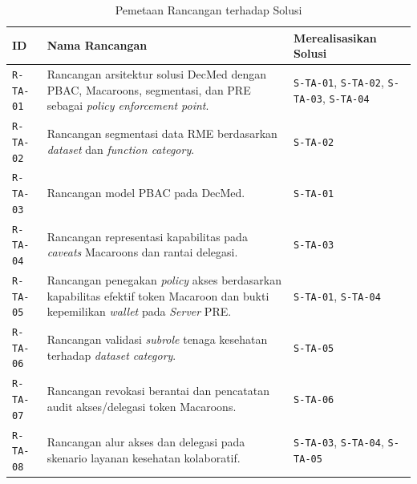 \documentclass[bahasa, 12pt, a4paper, onecolumn, oneside, final]{report}
\begin{document}
\begin{table}[!ht]
	\centering
	\caption{Pemetaan Rancangan terhadap Solusi}
	\label{tab:daftar-rancangan-solusi}
	\small
	\begin{tabular}{|p{}|p{}|p{}|}
		\hline
		\textbf{ID}      & \textbf{Nama Rancangan}                                                                                                                                  & \textbf{Merealisasikan Solusi}                                         \\ \hline
		\texttt{R-TA-01} & Rancangan arsitektur solusi DecMed dengan PBAC, Macaroons, segmentasi, dan PRE sebagai \textit{policy enforcement point}.                                & \texttt{S-TA-01}, \texttt{S-TA-02}, \texttt{S-TA-03}, \texttt{S-TA-04} \\ \hline
		\texttt{R-TA-02} & Rancangan segmentasi data RME berdasarkan \textit{dataset} dan \textit{function category}.                                                               & \texttt{S-TA-02}                                                       \\ \hline
		\texttt{R-TA-03} & Rancangan model PBAC pada DecMed.                                                                                                                        & \texttt{S-TA-01}                                                       \\ \hline
		\texttt{R-TA-04} & Rancangan representasi kapabilitas pada \textit{caveats} Macaroons dan rantai delegasi.                                                                  & \texttt{S-TA-03}                                                       \\ \hline
		\texttt{R-TA-05} & Rancangan penegakan \textit{policy} akses berdasarkan kapabilitas efektif token Macaroon dan bukti kepemilikan \textit{wallet} pada \textit{Server} PRE. & \texttt{S-TA-01}, \texttt{S-TA-04}                                     \\ \hline
		\texttt{R-TA-06} & Rancangan validasi \textit{subrole} tenaga kesehatan terhadap \textit{dataset category}.                                                                 & \texttt{S-TA-05}                                                       \\ \hline
		\texttt{R-TA-07} & Rancangan revokasi berantai dan pencatatan audit akses/delegasi token Macaroons.                                                                         & \texttt{S-TA-06}                                                       \\ \hline
		\texttt{R-TA-08} & Rancangan alur akses dan delegasi pada skenario layanan kesehatan kolaboratif.                                                                           & \texttt{S-TA-03}, \texttt{S-TA-04}, \texttt{S-TA-05}                   \\ \hline
	\end{tabular}
\end{table}
\end{document}
